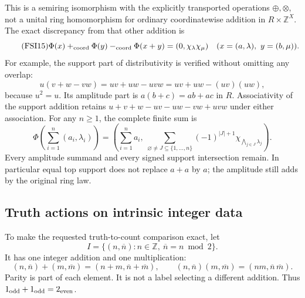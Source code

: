 This is a semiring isomorphism with the explicitly transported
operations \(\oplus,\otimes\), not a unital ring homomorphism for
ordinary coordinatewise addition in \(R\times\mathbb Z^X\).
The exact discrepancy from that other addition is
\begin{equation}\tag{FSI15}
\Phi(x)+_{\rm coord}\Phi(y)-_{\rm coord}\Phi(x+y)
=(0,\chi_\lambda\chi_\mu)
\quad(x=(a,\lambda),\ y=(b,\mu)).
\end{equation}
For example, the support part of distributivity is verified without
omitting any overlap:
\[
u(v+w-vw)=uv+uw-uvw
=uv+uw-(uv)(uw),
\]
because \(u^2=u\). Its amplitude part is
\(a(b+c)=ab+ac\) in \(R\). Associativity of the support addition
retains
\(u+v+w-uv-uw-vw+uvw\) under either association.
For any \(n\ge1\), the complete finite sum is
\begin{equation}\tag{FSI16}
\Phi\left(\sum_{i=1}^n(a_i,\lambda_i)\right)
=\left(\sum_{i=1}^n a_i,\
\sum_{\varnothing\ne J\subseteq\{1,\ldots,n\}}
(-1)^{|J|+1}\chi_{\bigwedge_{j\in J}\lambda_j}\right).
\end{equation}
Every amplitude summand and every signed support intersection remain.
In particular equal top support does not replace \(a+a\) by \(a\);
the amplitude still adds by the original ring law.

\subsection{Truth actions on intrinsic integer data}

To make the requested truth-to-count comparison exact, let
\[
I=\{(n,\overline n):n\in\mathbb Z,\ \overline n=n\bmod2\}.
\]
It has one integer addition and one multiplication:
\begin{equation}\tag{FSI17}
(n,\overline n)+(m,\overline m)
=(n+m,\overline n+\overline m),\qquad
(n,\overline n)(m,\overline m)=(nm,\overline n\,\overline m).
\end{equation}
Parity is part of each element. It is not a label selecting a
different addition. Thus \(1_{\rm odd}+1_{\rm odd}=2_{\rm even}\).

